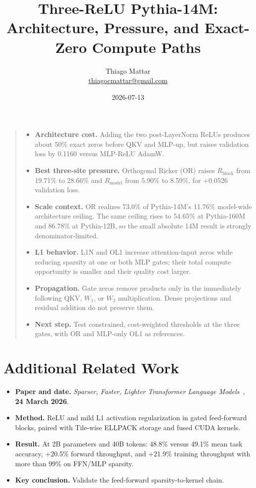 \documentclass[10pt]{article}
\title{Three-ReLU Pythia-14M: Architecture, Pressure, and Exact-Zero Compute Paths}
\author{Thiago Mattar\\\href{mailto:thiagocmattar@gmail.com}{thiagocmattar@gmail.com}}
\date{2026-07-13}
\newcommand{\pct}{\%}
\newcommand{\tightsection}[1]{\section{#1}\vspace{-0.35em}}
\begin{document}
\maketitle
\vspace{-1.35em}

\begin{quote}
\begin{itemize}[leftmargin=1.2em, itemsep=0.1em, topsep=0.15em]
\item \textbf{Architecture cost.} Adding the two post-LayerNorm ReLUs produces about 50\pct{} exact zeros before QKV and MLP-up, but raises validation loss by 0.1160 versus MLP-ReLU AdamW.
\item \textbf{Best three-site pressure.} Orthogonal Ricker (OR) raises $R_{\mathrm{block}}$ from 19.71\pct{} to 28.66\pct{} and $R_{\mathrm{model}}$ from 5.90\pct{} to 8.59\pct{}, for +0.0526 validation loss.
\item \textbf{Scale context.} OR realizes 73.0\pct{} of Pythia-14M's 11.76\pct{} model-wide architecture ceiling. The same ceiling rises to 54.65\pct{} at Pythia-160M and 86.78\pct{} at Pythia-12B, so the small absolute 14M result is strongly denominator-limited.
\item \textbf{L1 behavior.} L1N and OL1 increase attention-input zeros while reducing sparsity at one or both MLP gates; their total compute opportunity is smaller and their quality cost larger.
\item \textbf{Propagation.} Gate zeros remove products only in the immediately following QKV, $W_1$, or $W_2$ multiplication. Dense projections and residual addition do not preserve them.
\item \textbf{Next step.} Test constrained, cost-weighted thresholds at the three gates, with OR and MLP-only OL1 as references.
\end{itemize}
\end{quote}

\tightsection{Additional Related Work}

\begin{itemize}[leftmargin=1.3em]
\item \textbf{Paper and date.} \textit{Sparser, Faster, Lighter Transformer Language Models}~\cite{cetin2026}, \textbf{24 March 2026}.
\item \textbf{Method.} ReLU and mild L1 activation regularization in gated feed-forward blocks, paired with Tile-wise ELLPACK storage and fused CUDA kernels.
\item \textbf{Result.} At 2B parameters and 40B tokens: 48.8\pct{} versus 49.1\pct{} mean task accuracy, +20.5\pct{} forward throughput, and +21.9\pct{} training throughput with more than 99\pct{} on FFN/MLP sparsity.
\item \textbf{Key conclusion.} Validate the feed-forward sparsity-to-kernel chain.
\end{itemize}
\end{document}
